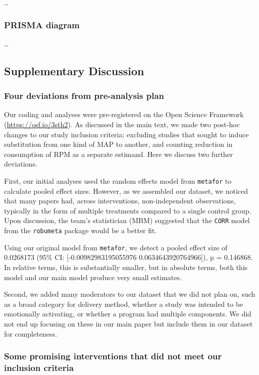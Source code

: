\documentclass[sn-nature,referee,pdflatex]{sn-jnl}
\begin{document}
\ldots{}

\subsubsection{PRISMA diagram}\label{prisma-diagram}

\ldots{}

\subsection{Supplementary Discussion}\label{supplementary-discussion}

\subsubsection{Four deviations from pre-analysis
plan}\label{four-deviations-from-pre-analysis-plan}

Our coding and analyses were pre-registered on the Open Science
Framework (\url{https://osf.io/3sth2}). As discussed in the main text,
we made two post-hoc changes to our study inclusion criteria: excluding
studies that sought to induce substitution from one kind of MAP to
another, and counting reduction in consumption of RPM as a separate
estimand. Here we discuss two further deviations.

First, our initial analyses used the random effects model from
\texttt{metafor} to calculate pooled effect sizes. However, as we
assembled our dataset, we noticed that many papers had, across
interventions, non-independent observations, typically in the form of
multiple treatments compared to a single control group. Upon discussion,
the team's statistician (MBM) suggested that the \texttt{CORR} model
from the \texttt{robumeta} package would be a better fit.

Using our original model from \texttt{metafor}, we detect a pooled
effect size of 0.0268173 (95\% CI: {[}-0.00982983195055976
0.0634643920764966{]}), p = 0.146868. In relative terms, this is
substantially smaller, but in absolute terms, both this model and our
main model produce very small estimates.

Second, we added many moderators to our dataset that we did not plan on,
such as a broad category for delivery method, whether a study was
intended to be emotionally activating, or whether a program had multiple
components. We did not end up focusing on these in our main paper but
include them in our dataset for completeness.

\subsubsection{Some promising interventions that did not meet our
inclusion
criteria}\label{some-promising-interventions-that-did-not-meet-our-inclusion-criteria}
\end{document}
